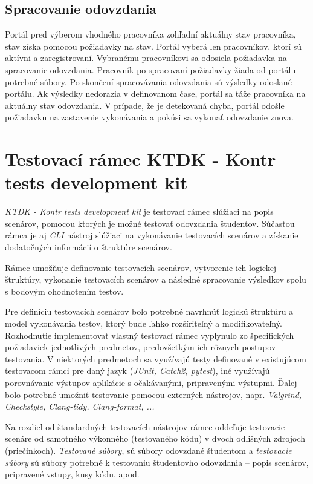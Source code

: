 \documentclass[
  digital, %
  twoside, %
  table,   %
  lof,     %
  lot,     %
]{fithesis3}
\begin{document}
\subsection{Spracovanie odovzdania}
Portál pred výberom vhodného pracovníka zohľadní aktuálny stav pracovníka, stav získa pomocou požiadavky na stav. Portál vyberá len pracovníkov, ktorí sú aktívni a zaregistrovaní. Vybranému pracovníkovi sa odosiela požiadavka na spracovanie odovzdania. Pracovník po spracovaní požiadavky žiada od portálu potrebné súbory. Po skončení spracovávania odovzdania sú výsledky odoslané portálu. Ak výsledky nedorazia v definovanom čase, portál sa táže pracovníka na aktuálny stav odovzdania. V prípade, že je detekovaná chyba, portál odošle požiadavku na zastavenie vykonávania a pokúsi sa vykonať odovzdanie znova. 



\section{Testovací rámec KTDK - Kontr tests development kit}
\emph{KTDK - Kontr tests development kit} je testovací rámec slúžiaci na popis scenárov, pomocou ktorých je možné testovať odovzdania študentov. Súčasťou rámca je aj \emph{CLI} nástroj slúžiaci na vykonávanie testovacích scenárov a získanie dodatočných informácií o štruktúre scenárov.

Rámec umožňuje definovanie testovacích scenárov, vytvorenie ich logickej štruktúry, vykonanie testovacích scenárov a následné spracovanie výsledkov spolu s bodovým ohodnotením testov.

Pre definíciu testovacích scenárov bolo potrebné navrhnúť logickú štruktúru a model vykonávania testov, ktorý bude ľahko rozšíriteľný a modifikovateľný. Rozhodnutie implementovať vlastný testovací rámec vyplynulo zo špecifických požiadaviek jednotlivých predmetov, predovšetkým ich rôznych postupov testovania. V niektorých predmetoch sa využívajú testy definované v existujúcom testovacom rámci pre daný jazyk (\emph{JUnit, Catch2, pytest}), iné využívajú porovnávanie výstupov aplikácie s očakávanými, pripravenými výstupmi. Ďalej bolo potrebné umožniť testovanie pomocou externých nástrojov, napr. \emph{Valgrind, Checkstyle, Clang-tidy, Clang-format, ...}

Na rozdiel od štandardných testovacích nástrojov rámec oddeľuje testovacie scenáre od samotného výkonného (testovaného kódu) v dvoch odlišných zdrojoch (priečinkoch). \emph{Testované súbory}, sú súbory odovzdané študentom a \emph{testovacie súbory} sú súbory potrebné k testovaniu študentovho odovzdania -- popis scenárov, pripravené vstupy, kusy kódu, apod.
\end{document}
